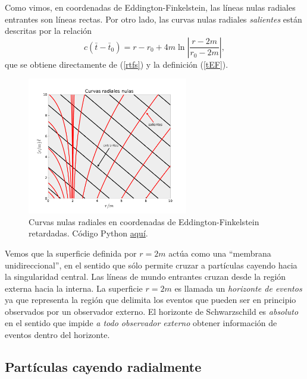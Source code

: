Como vimos, en coordenadas de Eddington-Finkelstein, las líneas nulas radiales entrantes son líneas rectas. Por otro lado, las curvas nulas radiales \textit{salientes} están descritas por la relación
\begin{equation}
 c(\bar{t}-\bar{t}_0)=r-r_0+4m\ln\left|\frac{r-2m}{r_0-2m}\right|,  \label{rtfsEF}
\end{equation}
que se obtiene directamente de (\ref{rtfs}) y la definición (\ref{tEF}).

\begin{figure}[H]
 \begin{center}
\includegraphics[height=6cm]{fig/fig-nullrays-cEF.pdf}
\caption{Curvas nulas radiales en coordenadas de Eddington-Finkelstein retardadas. Código Python \href{https://github.com/gfrubi/RG/blob/master/figuras-editables/fig-null-rays-cEF.py}{aquí}.}
\label{fig:nullrays-cEF}
\end{center}
\end{figure}

Vemos que la superficie definida por $r=2m$ actúa como una ``membrana unidireccional'', en el sentido que sólo permite cruzar a partículas cayendo hacia la singularidad central. Las líneas de mundo entrantes cruzan desde la región externa hacia la interna. La superficie $r=2m$ es llamada un \textit{horizonte de eventos} ya que representa la región que delimita los eventos que pueden ser en principio observados por un observador externo. El horizonte de Schwarzschild es \textit{absoluto} en el sentido que impide \textit{a todo observador externo} obtener información de eventos dentro del horizonte.

\subsection{Partículas cayendo radialmente}

